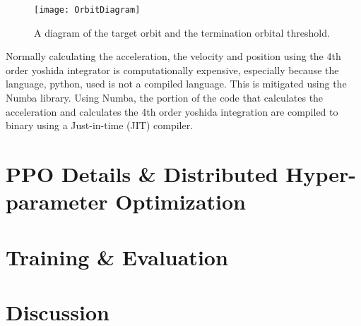 \begin{figure}
	\centering
	\texttt{[image: OrbitDiagram]}
	\caption{A diagram of the target orbit and the termination orbital threshold.}
	\label{fig:OrbitDiagram}
\end{figure}

Normally calculating the acceleration, the velocity and position using the 4th order yoshida integrator is computationally expensive, especially because the language, python, used is not a compiled language. This is mitigated using the Numba \cite{10.1145/2833157.2833162} library. Using Numba, the portion of the code that calculates the acceleration and calculates the 4th order yoshida integration are compiled to binary using a Just-in-time (JIT) compiler.
	
\section{PPO Details \& Distributed Hyper-parameter Optimization}

\section{Training \& Evaluation}

\section{Discussion}